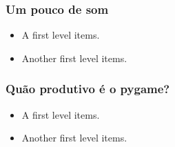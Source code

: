\begin{frame}
    \frametitle{Um pouco de som}

    \begin{itemize}
        \item A first level items.
        \item Another first level items.
    \end{itemize}
\end{frame}

\begin{frame}
    \frametitle{Quão produtivo é o pygame?}

    \begin{itemize}
        \item A first level items.
        \item Another first level items.
    \end{itemize}
\end{frame}






